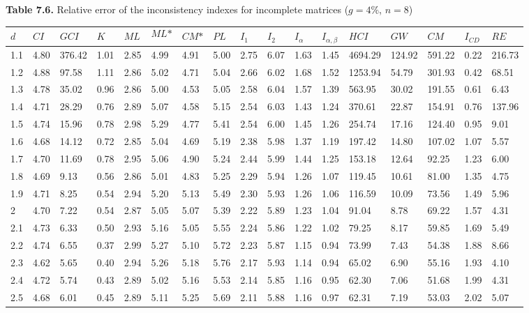 \newpage
\textbf{Table 7.6.} Relative error of the inconsistency indexes for incomplete matrices ($g=4\%$, $n=8$)
\begin{adjustbox}{angle=90}
  \begin{center}
    \begin{tabular}{|l|llllllllllllllll|}
      \hline $d$ &
$\textit{CI}$&$\textit{GCI}$&$K$&$\textit{ML}$&$$\textit{ML*}$$&$\textit{CM*}$&$\textit{PL}$&$\textit{I}_1$&$\textit{I}_2$&$\textit{I}_{\alpha}$&$\textit{I}_{\alpha,\beta}$&$\textit{HCI}$&$\textit{GW}$&$\textit{CM}$&$\textit{I}_{CD}$&$\textit{RE}$\\ \hline \hline
1.1&4.80&376.42&1.01&2.85&4.99&4.91&5.00&2.75&6.07&1.63&1.45&4694.29&124.92&591.22&0.22&216.73  \\ 
1.2&4.88&97.58&1.11&2.86&5.02&4.71&5.04&2.66&6.02&1.68&1.52&1253.94&54.79&301.93&0.42&68.51  \\ 
1.3&4.78&35.02&0.96&2.86&5.00&4.53&5.05&2.58&6.04&1.57&1.39&563.95&30.02&191.55&0.61&6.43  \\ 
1.4&4.71&28.29&0.76&2.89&5.07&4.58&5.15&2.54&6.03&1.43&1.24&370.61&22.87&154.91&0.76&137.96  \\ 
1.5&4.74&15.96&0.78&2.98&5.29&4.77&5.41&2.54&6.00&1.45&1.26&254.74&17.16&124.40&0.95&9.01  \\ 
1.6&4.68&14.12&0.72&2.85&5.04&4.69&5.19&2.38&5.98&1.37&1.19&197.42&14.80&107.02&1.07&5.57  \\ 
1.7&4.70&11.69&0.78&2.95&5.06&4.90&5.24&2.44&5.99&1.44&1.25&153.18&12.64&92.25&1.23&6.00  \\ 
1.8&4.69&9.13&0.56&2.86&5.01&4.83&5.25&2.29&5.94&1.26&1.07&119.45&10.61&81.00&1.35&4.75  \\ 
1.9&4.71&8.25&0.54&2.94&5.20&5.13&5.49&2.30&5.93&1.26&1.06&116.59&10.09&73.56&1.49&5.96  \\ 
2&4.70&7.22&0.54&2.87&5.05&5.07&5.39&2.22&5.89&1.23&1.04&91.04&8.78&69.22&1.57&4.31  \\ 
2.1&4.73&6.33&0.50&2.93&5.16&5.05&5.55&2.24&5.86&1.22&1.02&79.25&8.17&59.85&1.69&5.49  \\ 
2.2&4.74&6.55&0.37&2.99&5.27&5.10&5.72&2.23&5.87&1.15&0.94&73.99&7.43&54.38&1.88&8.66  \\ 
2.3&4.62&5.65&0.40&2.94&5.26&5.18&5.76&2.17&5.93&1.14&0.94&65.02&6.90&55.16&1.93&4.10  \\ 
2.4&4.72&5.74&0.43&2.89&5.02&5.16&5.53&2.14&5.85&1.16&0.95&62.30&7.06&51.68&1.99&4.31  \\ 
2.5&4.68&6.01&0.45&2.89&5.11&5.25&5.69&2.11&5.88&1.16&0.97&62.31&7.19&53.03&2.02&5.07  \\ 

\end{tabular}
\end{center}
\end{adjustbox}

